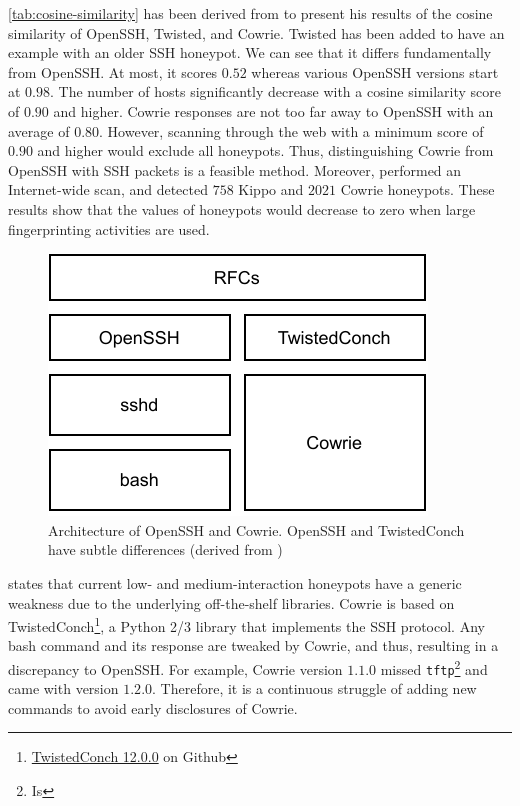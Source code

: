 \autoref{tab:cosine-similarity} has been derived from \citet{vetterl2020} to present his results of the cosine similarity of OpenSSH, Twisted, and Cowrie.
Twisted has been added to have an example with an older SSH honeypot.
We can see that it differs fundamentally from OpenSSH.
At most, it scores $0.52$ whereas various OpenSSH versions start at $0.98$.
The number of hosts significantly decrease with a cosine similarity score of $0.90$ and higher.
Cowrie responses are not too far away to OpenSSH with an average of $0.80$.
However, scanning through the web with a minimum score of $0.90$ and higher would exclude all honeypots.
Thus, distinguishing Cowrie from OpenSSH with SSH packets is a feasible method.
Moreover, \citet{vetterl2020} performed an Internet-wide scan, and detected $758$ Kippo and $2021$ Cowrie honeypots.
These results show that the values of honeypots would decrease to zero when large fingerprinting activities are used.

\begin{figure}[ht]
    \centering
    \includegraphics{figures/cowrie-openssh.pdf}
    \caption[Architecture of OpenSSH and Cowrie]{Architecture of OpenSSH and Cowrie. OpenSSH and TwistedConch have subtle differences (derived from \cite{vetterl2020})}
    \label{fig:cowrie-openssh}
\end{figure}

\citet{vetterl2020} states that current low- and medium-interaction honeypots have a generic weakness due to the underlying off-the-shelf libraries.
Cowrie is based on TwistedConch\footnote{\href{https://github.com/racker/python-twisted-conch/commit/01f22a3a8534856e934ed716cfc251b04e7d2077}{TwistedConch 12.0.0} on Github}, a Python 2/3 library that implements the SSH protocol.
Any bash command and its response are tweaked by Cowrie, and thus, resulting in a discrepancy to OpenSSH.
For example, Cowrie version $1.1.0$ missed \verb|tftp|\footnote{Is } and came with version $1.2.0$.
Therefore, it is a continuous struggle of adding new commands to avoid early disclosures of Cowrie.

